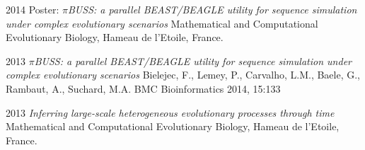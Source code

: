 \documentclass[a4paper, oneside, final]{scrartcl}
\newenvironment{lyxlist}[1]
{\begin{list}{}
{\settowidth{\labelwidth}{#1}
 \setlength{\leftmargin}{\labelwidth}
 \addtolength{\leftmargin}{\labelsep}
 \renewcommand{\makelabel}[1]{##1\hfil}}}
{\end{list}}
\newcommand{\noun}[1]{\textsc{#1}}
\begin{document}
\begin{center}
\begin{lyxlist}{00.00.0000}


\item [{\noun{\scriptsize 2014}}] Poster: \emph{$\pi$BUSS: a parallel BEAST/BEAGLE utility for sequence simulation under complex evolutionary scenarios}
Mathematical and Computational Evolutionary Biology, Hameau de l'Etoile, France.


\item [{\noun{\scriptsize 2013}}] \emph{$\pi$BUSS: a parallel BEAST/BEAGLE utility for sequence simulation under complex evolutionary scenarios}
Bielejec, F., Lemey, P., Carvalho, L.M., Baele, G., Rambaut, A., Suchard, M.A.
BMC Bioinformatics 2014, 15:133

\item [{\noun{\scriptsize 2013}}] \emph{Inferring large-scale heterogeneous evolutionary processes through time}
Mathematical and Computational Evolutionary Biology, Hameau de l'Etoile, France.




\end{lyxlist}
\end{center}
\end{document}
